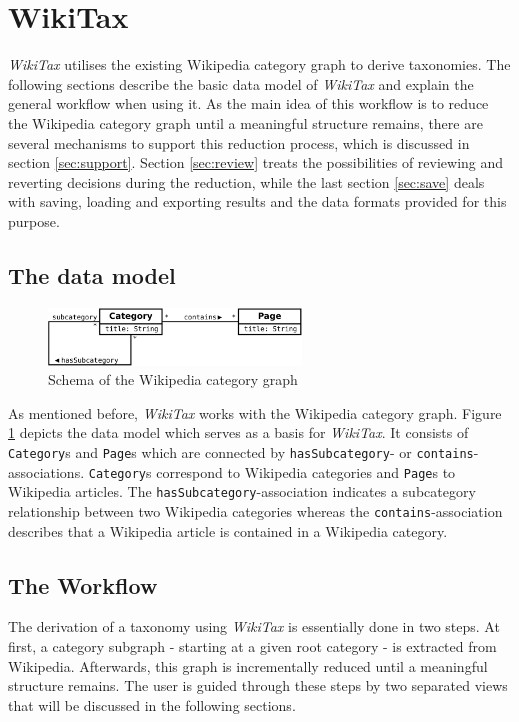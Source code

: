 \documentclass{scrartcl}
\begin{document}
\section{WikiTax}
\label{sec:wiki_tax}
\textit{WikiTax} utilises the existing Wikipedia category graph to derive taxonomies. The following sections describe the basic data model of \emph{WikiTax} and explain the general workflow when using it. As the main idea of this workflow is to reduce the Wikipedia category graph until a meaningful structure remains, there are several mechanisms to support this reduction process, which is discussed in section \ref{sec:support}. Section \ref{sec:review} treats the possibilities of reviewing and reverting decisions during the reduction, while the last section \ref{sec:save} deals with saving, loading and exporting results and the data formats provided for this purpose.

\subsection{The data model}

\begin{figure}[htb]
\centering
\includegraphics[width=0.6\textwidth]{figures/simple_schema.pdf} 
\caption{Schema of the Wikipedia category graph}
\label{fig:simple_schema}
\end{figure}

As mentioned before, \emph{WikiTax} works with the Wikipedia category graph. Figure \ref{fig:simple_schema} depicts the data model which serves as a basis for \emph{WikiTax}. It consists of \texttt{Category}s and \texttt{Page}s which are connected by \texttt{hasSubcategory}- or \texttt{contains}-associations. \texttt{Category}s correspond to Wikipedia categories and \texttt{Page}s to Wikipedia articles. The \texttt{hasSubcategory}-association indicates a subcategory relationship between two Wikipedia categories whereas the \texttt{contains}-association describes that a Wikipedia article is contained in a Wikipedia category.

\subsection{The Workflow}
The derivation of a taxonomy using \emph{WikiTax} is essentially done in two steps. At first, a category subgraph - starting at a given root category - is extracted from Wikipedia. Afterwards, this graph is incrementally reduced until a meaningful structure remains. The user is guided through these steps by two separated views that will be discussed in the following sections.
\end{document}
